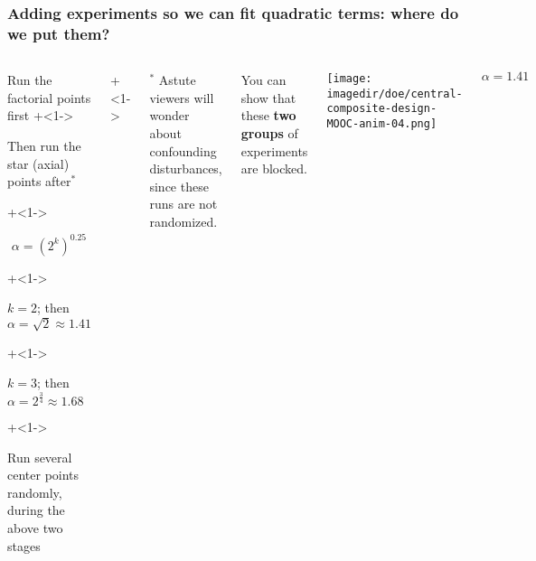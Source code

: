 \begin{frame}\frametitle{Adding experiments so we can fit quadratic terms: where do we put them?}
	\begin{columns}[T]
		
			\vspace{1cm}
			
			\begin{itemize}
				\item	Run the factorial points first
				\onslide+<1->{
					\item	Then run the star (axial) points after$^\ast$
				}
				\onslide+<1->{
					\Large
					\[\alpha  = \left(2^k\right)^{0.25}\]
					
			
					\begin{itemize}
						\onslide+<1->{\item	$k = 2$; then $\alpha = \sqrt{2} \approx 1.41$ }
						\onslide+<1->{\item	$k = 3$; then $\alpha = 2^{\tfrac{3}{4}} \approx 1.68$}
					\end{itemize}
					\normalsize
				}
				\onslide+<1->{
					\item	Run several center points randomly, during the above two stages
				}
			\end{itemize}
			
			\onslide+<1->{
				\vspace{0cm}
				\tiny
				$^\ast$ Astute viewers will wonder about confounding disturbances, since these runs are not randomized.
			
				You can show that these {\color[rgb]{0,0.5,1}\textbf{two}} {\color[rgb]{0.5,0, 0.5}\textbf{groups}} of experiments are blocked.
			}
			
			
			\centerline{\texttt{[image: \\imagedir/doe/central-composite-design-MOOC-anim-04.png]}}
			
			\vspace{-0.5cm}
			\[\alpha = 1.41\]
	\end{columns}
\end{frame}

